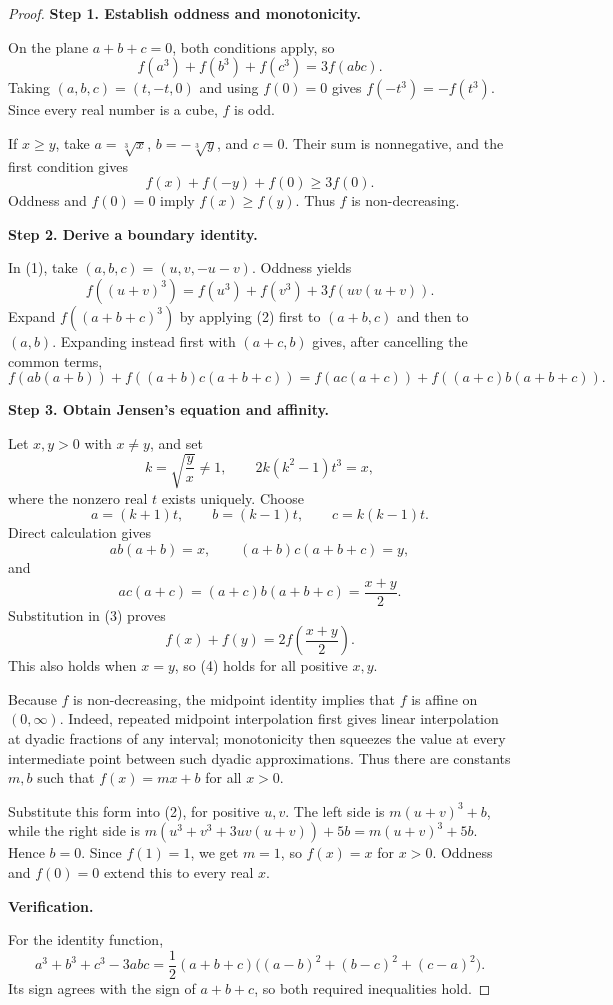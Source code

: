 
\begin{dlsummary}[title={\bfseries Solution 29. The Conditioned Cubic Squeeze},breakable]

\begin{proof}
\textbf{Step 1. Establish oddness and monotonicity.}

On the plane $a+b+c=0$, both conditions apply, so
\[
f(a^3)+f(b^3)+f(c^3)=3f(abc). \tag{1}
\]
Taking $(a,b,c)=(t,-t,0)$ and using $f(0)=0$ gives
$f(-t^3)=-f(t^3)$. Since every real number is a cube, $f$ is odd.

If $x\geq y$, take
$a=\sqrt[3]{x}$, $b=-\sqrt[3]{y}$, and $c=0$. Their sum is
nonnegative, and the first condition gives
\[
f(x)+f(-y)+f(0)\geq3f(0).
\]
Oddness and $f(0)=0$ imply $f(x)\geq f(y)$. Thus $f$ is
non-decreasing.

\medskip
\noindent
\textbf{Step 2. Derive a boundary identity.}

In (1), take $(a,b,c)=(u,v,-u-v)$. Oddness yields
\[
f((u+v)^3)=f(u^3)+f(v^3)+3f(uv(u+v)). \tag{2}
\]
Expand $f((a+b+c)^3)$ by applying (2) first to $(a+b,c)$ and then
to $(a,b)$. Expanding instead first with $(a+c,b)$ gives, after
cancelling the common terms,
\[
f(ab(a+b))+f((a+b)c(a+b+c))
=f(ac(a+c))+f((a+c)b(a+b+c)). \tag{3}
\]

\medskip
\noindent
\textbf{Step 3. Obtain Jensen's equation and affinity.}

Let $x,y>0$ with $x\ne y$, and set
\[
k=\sqrt{\frac yx}\ne1,
\qquad 2k(k^2-1)t^3=x,
\]
where the nonzero real $t$ exists uniquely. Choose
\[
a=(k+1)t,\qquad b=(k-1)t,\qquad c=k(k-1)t.
\]
Direct calculation gives
\[
ab(a+b)=x,\qquad (a+b)c(a+b+c)=y,
\]
and
\[
ac(a+c)=(a+c)b(a+b+c)=\frac{x+y}{2}.
\]
Substitution in (3) proves
\[
f(x)+f(y)=2f\!\left(\frac{x+y}{2}\right). \tag{4}
\]
This also holds when $x=y$, so (4) holds for all positive $x,y$.

Because $f$ is non-decreasing, the midpoint identity implies that $f$
is affine on $(0,\infty)$. Indeed, repeated midpoint interpolation
first gives linear interpolation at dyadic fractions of any interval;
monotonicity then squeezes the value at every intermediate point between
such dyadic approximations. Thus there are constants $m,b$ such that
$f(x)=mx+b$ for all $x>0$.

Substitute this form into (2), for positive $u,v$. The left side is
$m(u+v)^3+b$, while the right side is
$m(u^3+v^3+3uv(u+v))+5b=m(u+v)^3+5b$. Hence $b=0$.
Since $f(1)=1$, we get $m=1$, so $f(x)=x$ for $x>0$. Oddness
and $f(0)=0$ extend this to every real $x$.

\medskip
\noindent
\textbf{Verification.}

For the identity function,
\[
a^3+b^3+c^3-3abc
=\frac12(a+b+c)\bigl((a-b)^2+(b-c)^2+(c-a)^2\bigr).
\]
Its sign agrees with the sign of $a+b+c$, so both required
inequalities hold.
\end{proof}

\end{dlsummary}